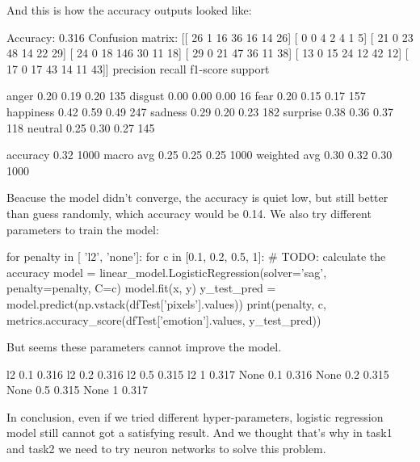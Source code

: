 \documentclass{article}
\begin{document}
And this is how the accuracy outputs looked like:\par

\begin{python}
Accuracy: 0.316
Confusion matrix:
[[ 26   1  16  36  16  14  26]
 [  0   0   4   2   4   1   5]
 [ 21   0  23  48  14  22  29]
 [ 24   0  18 146  30  11  18]
 [ 29   0  21  47  36  11  38]
 [ 13   0  15  24  12  42  12]
 [ 17   0  17  43  14  11  43]]
              precision    recall  f1-score   support

       anger       0.20      0.19      0.20       135
     disgust       0.00      0.00      0.00        16
        fear       0.20      0.15      0.17       157
   happiness       0.42      0.59      0.49       247
     sadness       0.29      0.20      0.23       182
    surprise       0.38      0.36      0.37       118
     neutral       0.25      0.30      0.27       145

    accuracy                           0.32      1000
   macro avg       0.25      0.25      0.25      1000
weighted avg       0.30      0.32      0.30      1000
\end{python}

Beacuse the model didn't converge, the accuracy is quiet low, but still better than guess randomly, which accuracy would be 0.14.
We also try different parameters to train the model: \par

\begin{python}
    for penalty in [ 'l2', 'none']:
    for c in [0.1, 0.2, 0.5, 1]:
        # TODO: calculate the accuracy
        model = linear_model.LogisticRegression(solver='sag', penalty=penalty, C=c)
        model.fit(x, y)
        y_test_pred = model.predict(np.vstack(dfTest['pixels'].values))
        print(penalty, c, metrics.accuracy_score(dfTest['emotion'].values, y_test_pred))
\end{python}

But seems these parameters cannot improve the model. \par

\begin{python}
    l2 0.1 0.316
    l2 0.2 0.316
    l2 0.5 0.315
    l2 1 0.317
    None 0.1 0.316
    None 0.2 0.315
    None 0.5 0.315
    None 1 0.317
\end{python}

In conclusion, even if we tried different hyper-parameters, logistic regression model still cannot got a satisfying result. 
And we thought that's why in task1 and task2 we need to try neuron networks to solve this problem.
\end{document}
